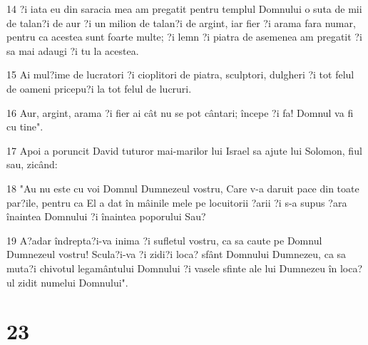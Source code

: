 \par 14 ?i iata eu din saracia mea am pregatit pentru templul Domnului o suta de mii de talan?i de aur ?i un milion de talan?i de argint, iar fier ?i arama fara numar, pentru ca acestea sunt foarte multe; ?i lemn ?i piatra de asemenea am pregatit ?i sa mai adaugi ?i tu la acestea.
\par 15 Ai mul?ime de lucratori ?i cioplitori de piatra, sculptori, dulgheri ?i tot felul de oameni pricepu?i la tot felul de lucruri.
\par 16 Aur, argint, arama ?i fier ai cât nu se pot cântari; începe ?i fa! Domnul va fi cu tine".
\par 17 Apoi a poruncit David tuturor mai-marilor lui Israel sa ajute lui Solomon, fiul sau, zicând:
\par 18 "Au nu este cu voi Domnul Dumnezeul vostru, Care v-a daruit pace din toate par?ile, pentru ca El a dat în mâinile mele pe locuitorii ?arii ?i s-a supus ?ara înaintea Domnului ?i înaintea poporului Sau?
\par 19 A?adar îndrepta?i-va inima ?i sufletul vostru, ca sa caute pe Domnul Dumnezeul vostru! Scula?i-va ?i zidi?i loca? sfânt Domnului Dumnezeu, ca sa muta?i chivotul legamântului Domnului ?i vasele sfinte ale lui Dumnezeu în loca?ul zidit numelui Domnului".

\chapter{23}

